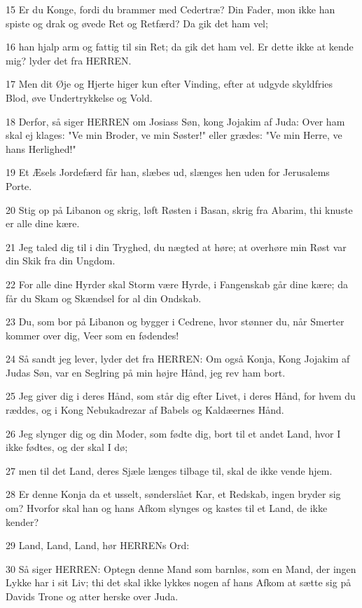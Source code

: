 \par 15 Er du Konge, fordi du brammer med Cedertræ? Din Fader, mon ikke han spiste og drak og øvede Ret og Retfærd? Da gik det ham vel;
\par 16 han hjalp arm og fattig til sin Ret; da gik det ham vel. Er dette ikke at kende mig? lyder det fra HERREN.
\par 17 Men dit Øje og Hjerte higer kun efter Vinding, efter at udgyde skyldfries Blod, øve Undertrykkelse og Vold.
\par 18 Derfor, så siger HERREN om Josiass Søn, kong Jojakim af Juda: Over ham skal ej klages: "Ve min Broder, ve min Søster!" eller grædes: "Ve min Herre, ve hans Herlighed!"
\par 19 Et Æsels Jordefærd får han, slæbes ud, slænges hen uden for Jerusalems Porte.
\par 20 Stig op på Libanon og skrig, løft Røsten i Basan, skrig fra Abarim, thi knuste er alle dine kære.
\par 21 Jeg taled dig til i din Tryghed, du nægted at høre; at overhøre min Røst var din Skik fra din Ungdom.
\par 22 For alle dine Hyrder skal Storm være Hyrde, i Fangenskab går dine kære; da får du Skam og Skændsel for al din Ondskab.
\par 23 Du, som bor på Libanon og bygger i Cedrene, hvor stønner du, når Smerter kommer over dig, Veer som en fødendes!
\par 24 Så sandt jeg lever, lyder det fra HERREN: Om også Konja, Kong Jojakim af Judas Søn, var en Seglring på min højre Hånd, jeg rev ham bort.
\par 25 Jeg giver dig i deres Hånd, som står dig efter Livet, i deres Hånd, for hvem du ræddes, og i Kong Nebukadrezar af Babels og Kaldæernes Hånd.
\par 26 Jeg slynger dig og din Moder, som fødte dig, bort til et andet Land, hvor I ikke fødtes, og der skal I dø;
\par 27 men til det Land, deres Sjæle længes tilbage til, skal de ikke vende hjem.
\par 28 Er denne Konja da et usselt, sønderslået Kar, et Redskab, ingen bryder sig om? Hvorfor skal han og hans Afkom slynges og kastes til et Land, de ikke kender?
\par 29 Land, Land, Land, hør HERRENs Ord:
\par 30 Så siger HERREN: Optegn denne Mand som barnløs, som en Mand, der ingen Lykke har i sit Liv; thi det skal ikke lykkes nogen af hans Afkom at sætte sig på Davids Trone og atter herske over Juda.

